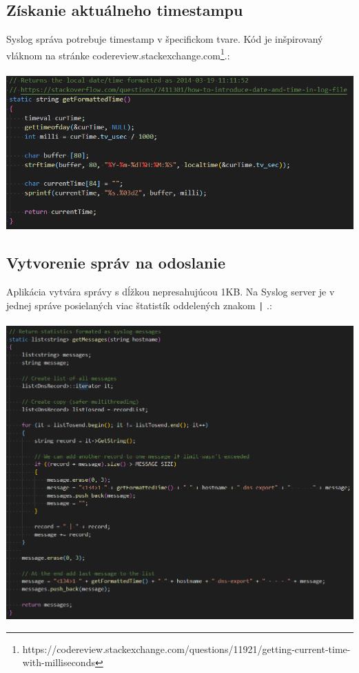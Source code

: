 \documentclass{article}
\begin{document}
        \newpage

        \subsection{Získanie aktuálneho timestampu}
        Syslog správa potrebuje timestamp v špecifickom tvare. Kód je inšpirovaný vláknom na stránke
        codereview.stackexchange.com\footnote{https://codereview.stackexchange.com/questions/11921/getting-current-time-with-milliseconds}.:\\\\
        \includegraphics[scale=0.6]{timestamp.png}

        \newpage

        \subsection{Vytvorenie správ na odoslanie}
        Aplikácia vytvára správy s dĺžkou nepresahujúcou 1KB. Na Syslog server je v jednej správe posielaných viac štatistík oddelených znakom \texttt{|} .:\\\\
        \includegraphics[scale=0.6]{messages.png}
\end{document}
